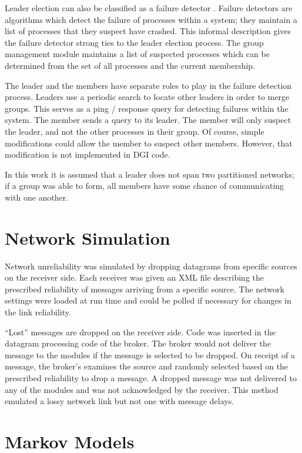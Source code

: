 Leader election can also be classified as a failure detector \cite{LEADERELECTIONEVAL}.
Failure detectors are algorithms which detect the failure of processes within a system; they maintain a list of processes that they suspect have crashed.
This informal description gives the failure detector strong ties to the leader election process. 
The group management module maintains a list of suspected processes which can be determined from the set of all processes and the current membership.

The leader and the members have separate roles to play in the failure detection process.
Leaders use a periodic search to locate other leaders in order to merge groups.
This serves as a ping / response query for detecting failures within the system.
The member sends a query to its leader.
The member will only suspect the leader, and not the other processes in their group.
Of course, simple modifications could allow the member to suspect other members.
However, that modification is not implemented in DGI code.

In this work it is assumed that a leader does not span two partitioned networks; if a group was able to form, all members have some chance of communicating with one another.

\section{Network Simulation}

Network unreliability was simulated by dropping datagrams from specific sources on the receiver side.
Each receiver was given an XML file describing the prescribed reliability of messages arriving from a specific source.
The network settings were loaded at run time and could be polled if necessary for changes in the link reliability.

``Lost'' messages are dropped on the receiver side. 
Code was inserted in the datagram processing code of the broker.
The broker would not deliver the message to the modules if the message is selected to be dropped.
On receipt of a message, the broker's examines the source and randomly selected based on the prescribed reliability to drop a message.
A dropped message was not delivered to any of the modules and was not acknowledged by the receiver.
This method emulated a lossy network link but not one with message delays.

\section{Markov Models}

